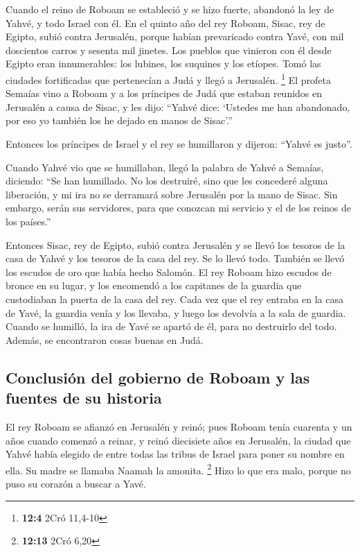 \begin{paracol}{2}
 Cuando el reino de Roboam se estableció y se hizo fuerte,
abandonó la ley de Yahvé, y todo Israel con él.  En el
quinto año del rey Roboam, Sisac, rey de Egipto, subió contra Jerusalén,
porque habían prevaricado contra Yavé,  con mil doscientos
carros y sesenta mil jinetes. Los pueblos que vinieron con él desde
Egipto eran innumerables: los lubines, los suquines y los etíopes.
 Tomó las ciudades fortificadas que pertenecían a Judá y
llegó a Jerusalén. \footnote{\textbf{12:4} 2Cró 11,4-10} 
El profeta Semaías vino a Roboam y a los príncipes de Judá que estaban
reunidos en Jerusalén a causa de Sisac, y les dijo: ``Yahvé dice:
`Ustedes me han abandonado, por eso yo también los he dejado en manos de
Sisac'.''

 Entonces los príncipes de Israel y el rey se humillaron y
dijeron: ``Yahvé es justo''.

 Cuando Yahvé vio que se humillaban, llegó la palabra de
Yahvé a Semaías, diciendo: ``Se han humillado. No los destruiré, sino
que les concederé alguna liberación, y mi ira no se derramará sobre
Jerusalén por la mano de Sisac.  Sin embargo, serán sus
servidores, para que conozcan mi servicio y el de los reinos de los
países.''

 Entonces Sisac, rey de Egipto, subió contra Jerusalén y
se llevó los tesoros de la casa de Yahvé y los tesoros de la casa del
rey. Se lo llevó todo. También se llevó los escudos de oro que había
hecho Salomón.  El rey Roboam hizo escudos de bronce en
su lugar, y los encomendó a los capitanes de la guardia que custodiaban
la puerta de la casa del rey.  Cada vez que el rey
entraba en la casa de Yavé, la guardia venía y los llevaba, y luego los
devolvía a la sala de guardia.  Cuando se humilló, la ira
de Yavé se apartó de él, para no destruirlo del todo. Además, se
encontraron cosas buenas en Judá.

\hypertarget{conclusiuxf3n-del-gobierno-de-roboam-y-las-fuentes-de-su-historia}{%
\subsection{Conclusión del gobierno de Roboam y las fuentes de su
historia}\label{conclusiuxf3n-del-gobierno-de-roboam-y-las-fuentes-de-su-historia}}

 El rey Roboam se afianzó en Jerusalén y reinó; pues
Roboam tenía cuarenta y un años cuando comenzó a reinar, y reinó
diecisiete años en Jerusalén, la ciudad que Yahvé había elegido de entre
todas las tribus de Israel para poner su nombre en ella. Su madre se
llamaba Naamah la amonita. \footnote{\textbf{12:13} 2Cró 6,20}
 Hizo lo que era malo, porque no puso su corazón a buscar
a Yavé.


\end{paracol}
